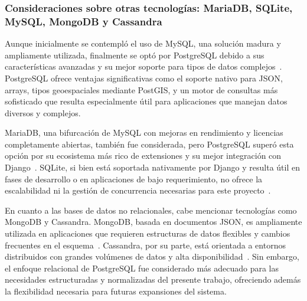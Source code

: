 \subsubsection{Consideraciones sobre otras tecnologías: MariaDB, SQLite, MySQL, MongoDB y Cassandra}

Aunque inicialmente se contempló el uso de MySQL, una solución madura y ampliamente utilizada, finalmente se optó por PostgreSQL debido a sus características avanzadas y su mejor soporte para tipos de datos complejos~\cite{postgresql2024}. PostgreSQL ofrece ventajas significativas como el soporte nativo para JSON, arrays, tipos geoespaciales mediante PostGIS, y un motor de consultas más sofisticado que resulta especialmente útil para aplicaciones que manejan datos diversos y complejos.

MariaDB, una bifurcación de MySQL con mejoras en rendimiento y licencias completamente abiertas, también fue considerada, pero PostgreSQL superó esta opción por su ecosistema más rico de extensiones y su mejor integración con Django~\cite{mariadb2023}. SQLite, si bien está soportada nativamente por Django y resulta útil en fases de desarrollo o en aplicaciones de bajo requerimiento, no ofrece la escalabilidad ni la gestión de concurrencia necesarias para este proyecto~\cite{django_sqlite2024}. 

En cuanto a las bases de datos no relacionales, cabe mencionar tecnologías como MongoDB y Cassandra. MongoDB, basada en documentos JSON, es ampliamente utilizada en aplicaciones que requieren estructuras de datos flexibles y cambios frecuentes en el esquema~\cite{mongodb2024}. Cassandra, por su parte, está orientada a entornos distribuidos con grandes volúmenes de datos y alta disponibilidad~\cite{cassandra2023}. Sin embargo, el enfoque relacional de PostgreSQL fue considerado más adecuado para las necesidades estructuradas y normalizadas del presente trabajo, ofreciendo además la flexibilidad necesaria para futuras expansiones del sistema.